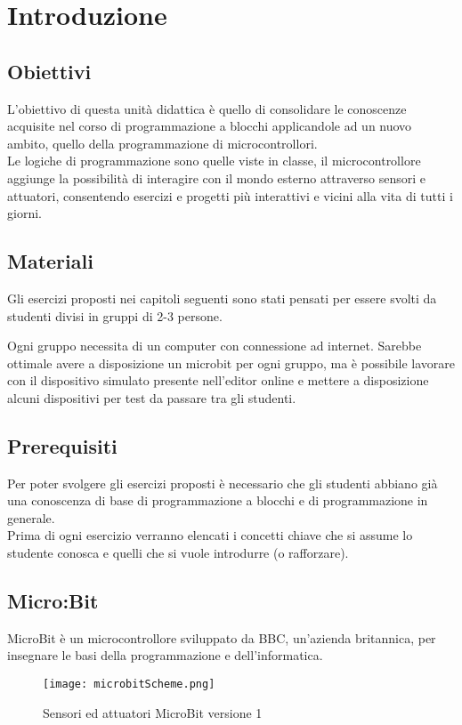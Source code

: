 \documentclass[../../docenti.tex]{subfiles}
\begin{document}
\section{Introduzione}

\subsection{Obiettivi}
L'obiettivo di questa unità didattica è quello di consolidare le conoscenze acquisite nel corso di programmazione a blocchi applicandole ad un nuovo ambito, quello della programmazione di microcontrollori.\\
Le logiche di programmazione sono quelle viste in classe, il microcontrollore aggiunge la possibilità di interagire con il mondo esterno attraverso sensori e attuatori, consentendo esercizi e progetti più interattivi e vicini alla vita di tutti i giorni. 


\subsection{Materiali}
Gli esercizi proposti nei capitoli seguenti sono stati pensati per essere svolti da studenti divisi in gruppi di 2-3 persone.

Ogni gruppo necessita di un computer con connessione ad internet. Sarebbe ottimale avere a disposizione un microbit per ogni gruppo, ma è possibile lavorare con il dispositivo simulato presente nell'editor online e mettere a disposizione alcuni dispositivi per test da passare tra gli studenti.

\subsection{Prerequisiti}
Per poter svolgere gli esercizi proposti è necessario che gli studenti abbiano già una conoscenza di base di programmazione a blocchi e di programmazione in generale.\\
Prima di ogni esercizio verranno elencati i concetti chiave che si assume lo studente conosca e quelli che si vuole introdurre (o rafforzare).

\newpage
\subsection{Micro:Bit}
 MicroBit è un microcontrollore sviluppato da BBC, un'azienda britannica, per insegnare le basi della programmazione e dell'informatica.

\begin{figure}[H]
 	\centering
 	\texttt{[image: microbitScheme.png]}
 	\caption{Sensori ed attuatori MicroBit versione 1 \parencite{MicrobitOverview}}
 	\label{fig:microbit}
\end{figure}
\end{document}
